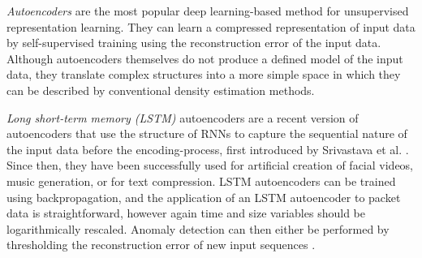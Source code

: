 \documentclass[a4paper,12pt,twoside]{report}
\begin{document}
\textit{Autoencoders} are the most popular deep learning-based method for unsupervised representation learning. They can learn a compressed representation of input data by self-supervised training using the reconstruction error of the input data. Although autoencoders themselves do not produce a defined model of the input data, they translate complex structures into a more simple space in which they can be described by conventional density estimation methods. 

\textit{Long short-term memory (LSTM)} autoencoders are a recent version of autoencoders that use the structure of RNNs to capture the sequential nature of the input data before the encoding-process, first introduced by Srivastava et al. \cite{srivastava2015unsupervised}. Since then, they have been successfully used for artificial creation of facial videos, music generation, or for text compression.
LSTM autoencoders can be trained using backpropagation, and the application of an LSTM autoencoder to packet data is straightforward, however again time and size variables should be logarithmically rescaled. Anomaly detection can then either be performed by thresholding the reconstruction error of new input sequences \cite{malhotra2016lstm}.
 
\end{document}
